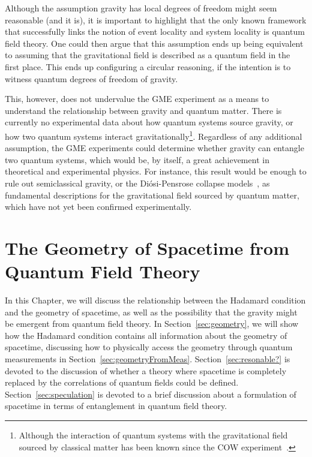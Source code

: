 \documentclass[letterpaper,12pt,titlepage,oneside,final]{book}
\begin{document}
Although the assumption gravity has local degrees of freedom might seem reasonable (and it is), it is important to highlight that the only known framework that successfully links the notion of event locality and system locality is quantum field theory. One could then argue that this assumption ends up being equivalent to assuming that the gravitational field is described as a quantum field in the first place. This ends up configuring a circular reasoning, if the intention is to witness quantum degrees of freedom of gravity.

This, however, does not undervalue the GME experiment as a means to understand the relationship between gravity and quantum matter. There is currently no experimental data about how quantum systems source gravity, or how two quantum systems interact gravitationally\footnote{Although the interaction of quantum systems with the gravitational field sourced by classical matter has been known since the COW experiment~\cite{COW}.}. Regardless of any additional assumption, the GME experiments could determine whether gravity can entangle two quantum systems, which would be, by itself, a great achievement in theoretical and experimental physics. For instance, this result would be enough to rule out semiclassical gravity, or the Di\'osi-Pensrose collapse models~\cite{DiosiGravMeas,PenroseCollapse}, as fundamental descriptions for the gravitational field sourced by quantum matter, which have not yet been confirmed experimentally.



\chapter{The Geometry of Spacetime from Quantum Field Theory}\label{chap:geometry}

In this Chapter, we will discuss the relationship between the Hadamard condition and the geometry of spacetime, as well as the possibility that the gravity might be emergent from quantum field theory. In Section~\ref{sec:geometry}, we will show how the Hadamard condition contains all information about the geometry of spacetime, discussing how to physically access the geometry through quantum measurements in Section~\ref{sec:geometryFromMeas}. Section~\ref{sec:resonable?} is devoted to the discussion of whether a theory where spacetime is completely replaced by the correlations of quantum fields could be defined. Section~\ref{sec:speculation} is devoted to a brief discussion about a formulation of spacetime in terms of entanglement in quantum field theory.
\end{document}
